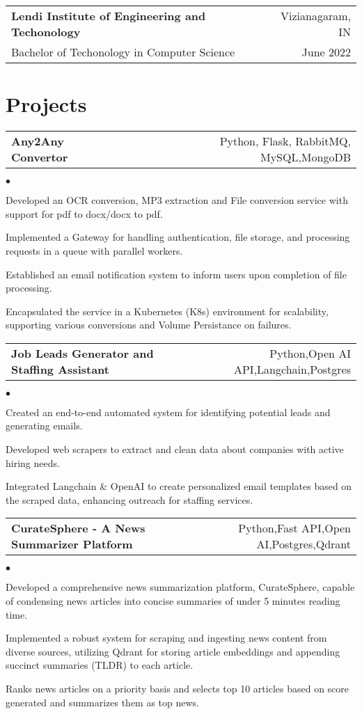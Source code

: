 \documentclass[margin, 11pt]{res}
\makeatletter
\newcommand{\resumeSubheading}[4]{

\begin{tabular*}{1.01\textwidth}{@{\hspace{-4pt}}l @{\extracolsep{\fill}} r}
\textbf{#1} & #2 \\
      {#3} &  {#4}
\end{tabular*}\vspace{-2pt}
}
\newcommand{\resumeSubSubheading}[2]{
\begin{tabular*}{1.01\textwidth}{@{\hspace{-4pt}}l @{\extracolsep{\fill}} r}
    #1 & #2 
\end{tabular*}\vspace{-7pt}
}
\newenvironment{list2}{
	\begin{list}{$\bullet$}{%
	    \small
		\setlength{\itemsep}{0in}
		\setlength{\parsep}{0in} \setlength{\parskip}{0in}
		\setlength{\topsep}{0in} \setlength{\partopsep}{0in}
		\setlength{\leftmargin}{0.2in}}}{\end{list}}
\makeatother
\begin{document}
\begin{resume}
\vspace{2pt}

\resumeSubheading{Lendi Institute of Engineering and Techonology}{Vizianagaram, IN}
             {Bachelor of Techonology in Computer Science}{June 2022}

\section{\sc Projects}

\resumeSubSubheading{\textbf{Any2Any Convertor}}
{Python, Flask, RabbitMQ, MySQL,MongoDB}

\begin{list2}
\item {Developed an OCR conversion, MP3 extraction and File conversion service with support for pdf to docx/docx to pdf.}
        \item {Implemented a Gateway for handling authentication, file storage, and processing requests in a queue with parallel workers.}
        \item {Established an email notification system to inform users upon completion of file processing.}
        \item {Encapsulated the service in a Kubernetes (K8s) environment for scalability, supporting various conversions and Volume Persistance on failures.}
\end{list2}

\resumeSubSubheading{\textbf{Job Leads Generator and Staffing Assistant}}
{Python,Open AI API,Langchain,Postgres}

\begin{list2}
        \item Created an end-to-end automated system for identifying potential leads and generating emails.
        \item Developed web scrapers to extract and clean data about companies with active hiring needs.
        \item Integrated Langchain \& OpenAI to create personalized email templates based on the scraped data, enhancing outreach for staffing services.
\end{list2}

\resumeSubSubheading{\textbf{CurateSphere - A News Summarizer Platform}}
{Python,Fast API,Open AI,Postgres,Qdrant}

\begin{list2}
    \item Developed a comprehensive news summarization platform, CurateSphere, capable of condensing news articles into concise summaries of under 5 minutes reading time.
    \item Implemented a robust system for scraping and ingesting news content from diverse sources, utilizing Qdrant for storing article embeddings and appending succinct summaries (TLDR) to each article.
    \item Ranks news articles on a priority basis and selects top 10 articles based on score generated and summarizes them as top news.
\end{list2}


\end{resume}
\end{document}
